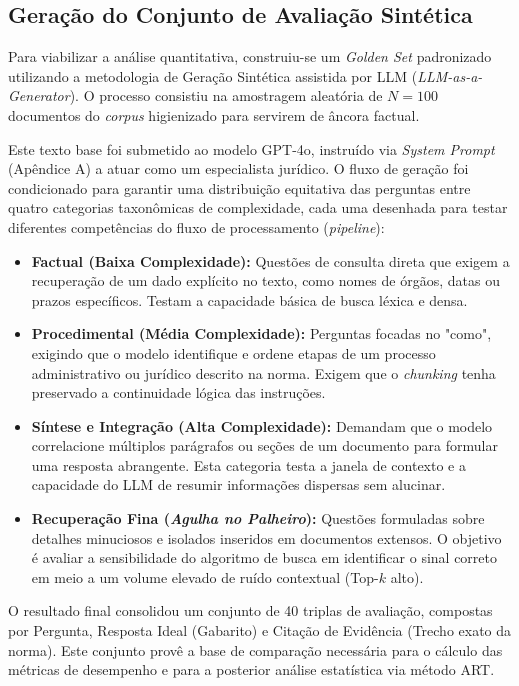 \subsection{Geração do Conjunto de Avaliação Sintética}

Para viabilizar a análise quantitativa, construiu-se um \textit{Golden Set} padronizado utilizando a metodologia de Geração Sintética assistida por LLM (\textit{LLM-as-a-Generator}). O processo consistiu na amostragem aleatória de $N=100$ documentos do \textit{corpus} higienizado para servirem de âncora factual.

Este texto base foi submetido ao modelo GPT-4o, instruído via \textit{System Prompt} (Apêndice A) a atuar como um especialista jurídico. O fluxo de geração foi condicionado para garantir uma distribuição equitativa das perguntas entre quatro categorias taxonômicas de complexidade, cada uma desenhada para testar diferentes competências do fluxo de processamento (\textit{pipeline}):

\begin{itemize}
  \item \textbf{Factual (Baixa Complexidade):} Questões de consulta direta que exigem a recuperação de um dado explícito no texto, como nomes de órgãos, datas ou prazos específicos. Testam a capacidade básica de busca léxica e densa.
  \item \textbf{Procedimental (Média Complexidade):} Perguntas focadas no "como", exigindo que o modelo identifique e ordene etapas de um processo administrativo ou jurídico descrito na norma. Exigem que o \textit{chunking} tenha preservado a continuidade lógica das instruções.
  \item \textbf{Síntese e Integração (Alta Complexidade):} Demandam que o modelo correlacione múltiplos parágrafos ou seções de um documento para formular uma resposta abrangente. Esta categoria testa a janela de contexto e a capacidade do LLM de resumir informações dispersas sem alucinar.
  \item \textbf{Recuperação Fina (\textit{Agulha no Palheiro}):} Questões formuladas sobre detalhes minuciosos e isolados inseridos em documentos extensos. O objetivo é avaliar a sensibilidade do algoritmo de busca em identificar o sinal correto em meio a um volume elevado de ruído contextual (Top-$k$ alto).
\end{itemize}

O resultado final consolidou um conjunto de 40 triplas de avaliação, compostas por Pergunta, Resposta Ideal (Gabarito) e Citação de Evidência (Trecho exato da norma). Este conjunto provê a base de comparação necessária para o cálculo das métricas de desempenho e para a posterior análise estatística via método ART.
